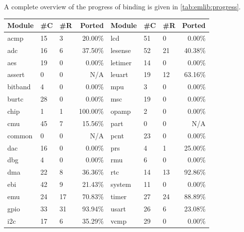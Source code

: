 A complete overview of the progress of binding {\emlib} is given in \autoref{tab:emlib:progress}.

\newcommand{\low}{\cellcolor{red!25}}
\newcommand{\medium}{\cellcolor{yellow!25}}
\newcommand{\high}{\cellcolor{green!25}}

\begin{table}[H]
  \begin{tabular}{l | l | l | r | l | l | l | r }
    \textbf{Module} & \textbf{\#C} & \textbf{\#R} & \textbf{Ported} & \textbf{Module} & \textbf{\#C} & \textbf{\#R} & \textbf{Ported} \\
    \hline
    acmp    & 15 & 3  & {\low}    20.00\% & lcd     & 51 &  0 & {\low}     0.00\% \\
    adc     & 16 & 6  & {\medium} 37.50\% & lesense & 52 & 21 & {\medium} 40.38\% \\
    aes     & 19 & 0  & {\low}     0.00\% & letimer & 14 &  0 & {\low}     0.00\% \\
    assert  & 0  & 0  &            N/A    & leuart  & 19 & 12 & {\medium} 63.16\% \\
    bitband & 4  & 0  & {\low}     0.00\% & mpu     &  3 &  0 & {\low}     0.00\% \\
    burtc   & 28 & 0  & {\low}     0.00\% & msc     & 19 &  0 & {\low}     0.00\% \\
    chip    & 1  & 1  & {\high}  100.00\% & opamp   &  2 &  0 & {\low}     0.00\% \\
    cmu     & 45 & 7  & {\low}    15.56\% & part    &  0 &  0 &            N/A    \\
    common  & 0  & 0  &            N/A    & pcnt    & 23 &  0 & {\low}     0.00\% \\
    dac     & 16 & 0  & {\low}     0.00\% & prs     &  4 &  1 & {\medium} 25.00\% \\
    dbg     & 4  & 0  & {\low}     0.00\% & rmu     &  6 &  0 & {\low}     0.00\% \\
    dma     & 22 & 8  & {\medium} 36.36\% & rtc     & 14 & 13 & {\high}   92.86\% \\
    ebi     & 42 & 9  & {\low}    21.43\% & system  & 11 &  0 & {\low}     0.00\% \\
    emu     & 24 & 17 & {\medium} 70.83\% & timer   & 27 & 24 & {\high}   88.89\% \\
    gpio    & 33 & 31 & {\high}   93.94\% & usart   & 26 &  6 & {\low}    23.08\% \\
    i2c     & 17 & 6  & {\medium} 35.29\% & vcmp    & 29 &  0 & {\low}     0.00\% \\

\end{tabular}
\end{table}
